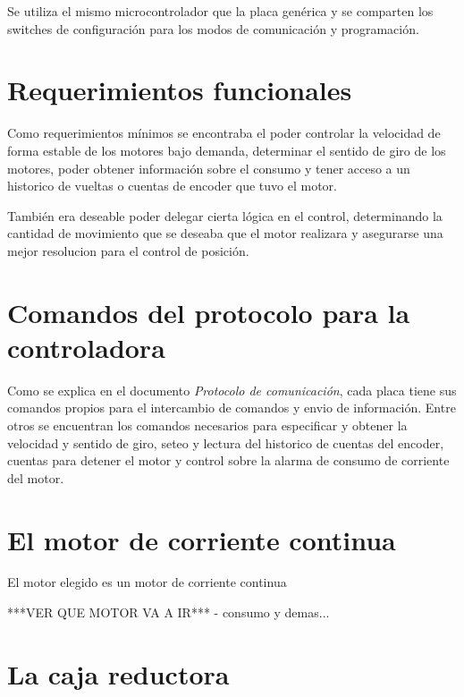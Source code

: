 \documentclass[a4paper,10pt]{article}
\begin{document}
Se utiliza el mismo microcontrolador que la placa gen\'erica y se comparten los switches de configuraci\'on para los modos de comunicaci\'on y programaci\'on.

\section{Requerimientos funcionales}
\label{requerimientos}

Como requerimientos m\'inimos se encontraba el poder controlar la velocidad de forma estable de los motores bajo demanda, determinar el sentido de giro
de los motores, poder obtener informaci\'on sobre el consumo y tener acceso a un historico de vueltas o cuentas de encoder que tuvo el motor.

Tambi\'en era deseable poder delegar cierta l\'ogica en el control, determinando la cantidad de movimiento que se deseaba que el motor realizara y
asegurarse una mejor resolucion para el control de posici\'on.

\section{Comandos del protocolo para la controladora}
\label{comandos}

Como se explica en el documento \emph{Protocolo de comunicaci\'on}, cada placa tiene sus comandos propios para el intercambio de comandos y envio de
informaci\'on.
Entre otros se encuentran los comandos necesarios para especificar y obtener la velocidad y sentido de giro, seteo y lectura del historico de cuentas
del encoder, cuentas para detener el motor y control sobre la alarma de consumo de corriente del motor.

\section{El motor de corriente continua}
\label{motor}

El motor elegido es un motor de corriente continua

***VER QUE MOTOR VA A IR*** - consumo y demas...

\section{La caja reductora}
\label{caja}
\end{document}
